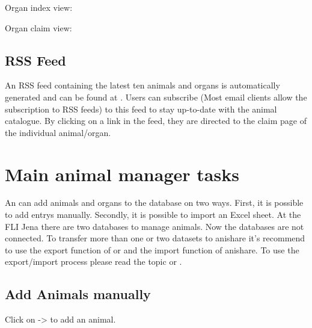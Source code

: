 \documentclass[letterpaper,10pt,openany,oneside,english]{sphinxmanual}
\begin{document}
Organ index view:

\noindent{}

Organ claim view:

\noindent{}


\section{RSS Feed}
\label{\detokenize{index:rss-feed}}
An RSS feed containing the latest ten animals and organs is automatically generated and can be found at
. Users can subscribe (Most email clients allow the subscription
to RSS feeds) to this feed to stay up-to-date with the animal catalogue. By clicking on a link in
the feed, they are directed to the claim page of the individual animal/organ.

\noindent{}


\chapter{Main animal manager tasks}
\label{\detokenize{index:main-animal-manager-tasks}}
An  can add animals and organs to the database on two ways. First, it is possible to
add entrys manually. Secondly, it is possible to import an Excel sheet. At the FLI Jena there are two
databases to manage animals. Now the databases are not connected. To transfer more than one or two datasets
to anishare it’s recommend to use the export function of  or  and the import function of anishare.
To use the export/import process please read the topic  or .

\noindent{}


\section{Add Animals manually}
\label{\detokenize{index:add-animals-manually}}
Click on  -\textgreater{}  to add an animal.

\noindent{}
\end{document}
